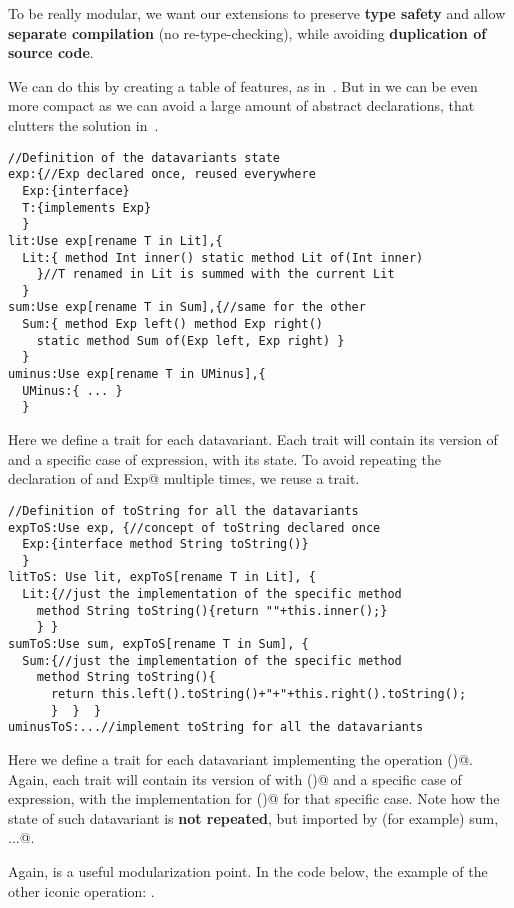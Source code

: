 To be really modular, we want our extensions to
preserve \textbf{type safety}
and allow \textbf{separate compilation} (no re-type-checking),
while avoiding \textbf{duplication of source code}.

We can do this by creating a table of features, as in~\cite{Deepfjig}.
But in \name we can be even more compact as we can avoid a large amount of abstract declarations,
that clutters the solution in~\cite{Deepfjig}.


\begin{lstlisting}
//Definition of the datavariants state
exp:{//Exp declared once, reused everywhere
  Exp:{interface}
  T:{implements Exp}
  }
lit:Use exp[rename T in Lit],{ 
  Lit:{ method Int inner() static method Lit of(Int inner)
    }//T renamed in Lit is summed with the current Lit
  }
sum:Use exp[rename T in Sum],{//same for the other
  Sum:{ method Exp left() method Exp right()
    static method Sum of(Exp left, Exp right) }
  }
uminus:Use exp[rename T in UMinus],{
  UMinus:{ ... }
  }

\end{lstlisting}
Here we define a trait for each datavariant.
Each trait will contain its version of \Q@Exp@
and a specific case of expression, with its state.
 To avoid repeating the declaration of \Q@Exp@ 
and \Q@implements Exp@ multiple times, we reuse
a \Q@exp@ trait.

\begin{lstlisting}
//Definition of toString for all the datavariants
expToS:Use exp, {//concept of toString declared once
  Exp:{interface method String toString()}
  }
litToS: Use lit, expToS[rename T in Lit], {
  Lit:{//just the implementation of the specific method
    method String toString(){return ""+this.inner();}
    } }
sumToS:Use sum, expToS[rename T in Sum], {
  Sum:{//just the implementation of the specific method
    method String toString(){
      return this.left().toString()+"+"+this.right().toString();
      }  }  }
uminusToS:...//implement toString for all the datavariants
\end{lstlisting}

Here we define a trait for each datavariant implementing the operation \Q@toString()@.
Again, each trait will contain its version of \Q@Exp@ with \Q@toString()@
and a specific case of expression, with the implementation for \Q@toString()@
for that specific case. Note how the state of such datavariant is 
\textbf{not repeated}, but imported by (for example) \Q@Use sum, ...@.

Again, \Q@expToS@ is a useful modularization point.
In the code below, the example of the other iconic operation: \Q@eval@.

